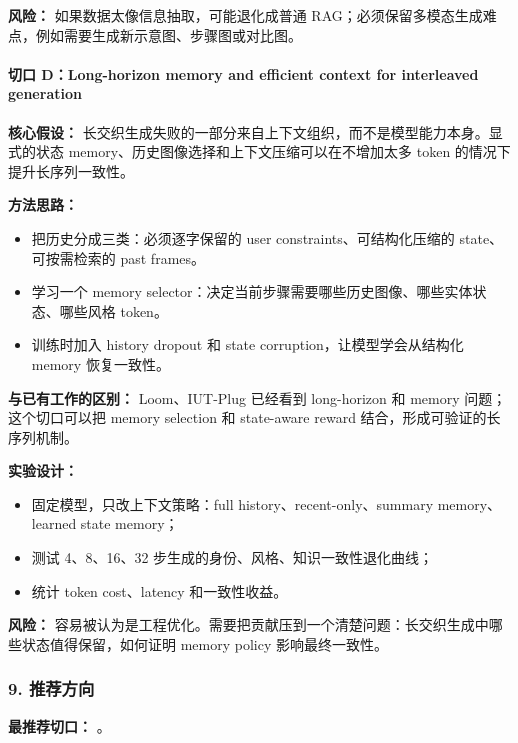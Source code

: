 \textbf{风险：} 如果数据太像信息抽取，可能退化成普通 RAG；必须保留多模态生成难点，例如需要生成新示意图、步骤图或对比图。

\paragraph{切口 D：Long-horizon memory and efficient context for interleaved generation}

\textbf{核心假设：} 长交织生成失败的一部分来自上下文组织，而不是模型能力本身。显式的状态 memory、历史图像选择和上下文压缩可以在不增加太多 token 的情况下提升长序列一致性。

\textbf{方法思路：}

\begin{itemize}[leftmargin=1.5em]
  \item 把历史分成三类：必须逐字保留的 user constraints、可结构化压缩的 state、可按需检索的 past frames。
  \item 学习一个 memory selector：决定当前步骤需要哪些历史图像、哪些实体状态、哪些风格 token。
  \item 训练时加入 history dropout 和 state corruption，让模型学会从结构化 memory 恢复一致性。
\end{itemize}

\textbf{与已有工作的区别：} Loom、IUT-Plug 已经看到 long-horizon 和 memory 问题；这个切口可以把 memory selection 和 state-aware reward 结合，形成可验证的长序列机制。

\textbf{实验设计：}

\begin{itemize}[leftmargin=1.5em]
  \item 固定模型，只改上下文策略：full history、recent-only、summary memory、learned state memory；
  \item 测试 4、8、16、32 步生成的身份、风格、知识一致性退化曲线；
  \item 统计 token cost、latency 和一致性收益。
\end{itemize}

\textbf{风险：} 容易被认为是工程优化。需要把贡献压到一个清楚问题：长交织生成中哪些状态值得保留，如何证明 memory policy 影响最终一致性。

\subsubsection*{9. 推荐方向}

\textbf{最推荐切口：} 。

